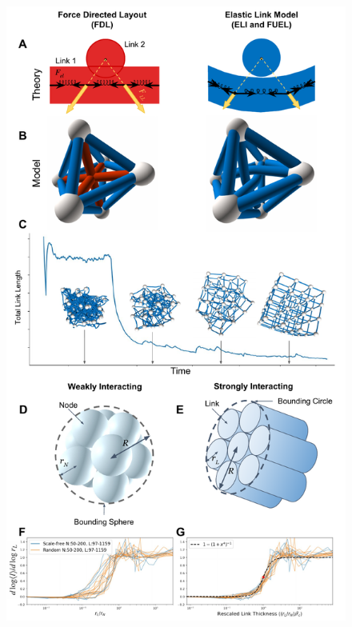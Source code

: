 \documentclass[linenumbers,endfloats,nofootinbib,preprint,floatfix,titlepage,superscriptaddress]{revtex4-1} %
\begin{document}
\linespread{1.5}
\begin{figure}
    \centering
    ~
\end{figure}
\begin{figure}
    \centering
    \includegraphics[width=.68\columnwidth, trim=0 1cm 0 4.5cm]{fig-09-19/3d-crs-lat-trans-041018.pdf}
    \caption{
}
\end{figure}
\end{document}
